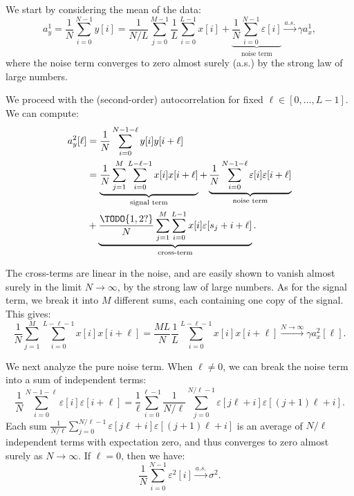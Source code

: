 \documentclass[9pt,twocolumn,twoside,lineno]{pnas-new}
\begin{document}
We start by considering the mean of the data:
%
\begin{equation}
a_y^1 = \frac{1}{N}\sum_{i=0}^{N-1} y[i] =
\frac{1}{N/L}\sum_{j=0}^{M-1}\frac{1}{L}\sum_{i=0}^{L-1}x[i] +    
\underbrace{\frac{1}{N}\sum_{i=0}^{N-1}\varepsilon[i]}_{\text{noise term}}
\xrightarrow{a.s.}\gamma a_x^1,
\end{equation}
%
where the noise term converges to zero almost surely (a.s.) by the strong law of large numbers.

We proceed with the (second-order) autocorrelation for fixed $\ell\in[0,\ldots,L-1]$. We can compute:
%
\begin{align*}
%
a_y^2[\ell] & = \frac{1}{N}\sum_{i=0}^{N-1-\ell}y[i]y[i+\ell]
\nonumber \\
& = \underbrace{\frac{1}{N}\sum_{j=1}^{M}\sum_{i=0}^{L-\ell-1}x[i]x[i+\ell]}_{\text{signal term}} + \underbrace{\frac{1}{N}\sum_{i=0}^{N-1-\ell}\varepsilon[i]\varepsilon[i+\ell]}_{\text{noise term}}
\\ & + \underbrace{\frac{\TODO{1,2?}}{N} \sum_{j=1}^{M} \sum_{i=0}^{L-1} x[i] \varepsilon[s_j + i + \ell]}_{\text{cross-term}}. 
%
\end{align*}

The cross-terms are linear in the noise, and are easily shown to vanish almost surely in the limit $N\to\infty$, by the strong law of large numbers. As for the signal term, we break it into $M$ different sums, each containing one copy of the signal. This gives:
%
\begin{equation} \label{eq:2nd_moment_signal_term}
%
\frac{1}{N}\sum_{j=1}^{M}\sum_{i=0}^{L-\ell-1}x[i]x[i+\ell] = \frac{ML}{N}\frac{1}{L}\sum_{i=0}^{L-\ell-1}x[i]x[i+\ell]\xrightarrow{N\to\infty}\gamma a_x^2[\ell].
%
\end{equation}
%

We next analyze the pure noise term. When $\ell\neq 0$, we can break the noise term into a sum of independent terms:
%
\begin{equation}
%
\frac{1}{N}\sum_{i=0}^{N-1-\ell} \varepsilon[i]\varepsilon[i+\ell] = \frac{1}{\ell}\sum_{i=0}^{\ell-1}\frac{1}{N/\ell}\sum_{j=0}^{N/\ell -1} \varepsilon[j\ell + i] \varepsilon[(j+1)\ell + i].
%
\end{equation}
%
Each sum $\frac{1}{N/\ell}\sum_{j=0}^{N/\ell -1} \varepsilon[j\ell + i] \varepsilon[(j+1)\ell + i]$ is an average of $N/\ell$ independent terms with expectation zero, and thus converges to zero almost surely as $N\to\infty$. If $\ell=0$, then we have:
%
\begin{equation}
%
\frac{1}{N}\sum_{i=0}^{N-1} \varepsilon^2[i] \xrightarrow{a.s.} \sigma^2.
%
\end{equation}
\end{document}
